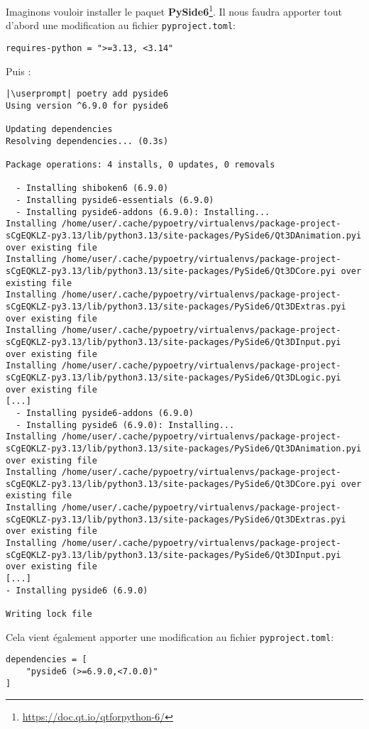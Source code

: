 Imaginons vouloir installer le paquet \textbf{PySide6}\footnote{\url{https://doc.qt.io/qtforpython-6/}}. Il nous faudra apporter tout d'abord une modification au fichier \texttt{pyproject.toml}:
\begin{lstlisting}[style=file]
requires-python = ">=3.13, <3.14"
\end{lstlisting}

Puis :
\begin{lstlisting}[style=bash]
|\userprompt| poetry add pyside6
Using version ^6.9.0 for pyside6

Updating dependencies
Resolving dependencies... (0.3s)

Package operations: 4 installs, 0 updates, 0 removals

  - Installing shiboken6 (6.9.0)
  - Installing pyside6-essentials (6.9.0)
  - Installing pyside6-addons (6.9.0): Installing...
Installing /home/user/.cache/pypoetry/virtualenvs/package-project-sCgEQKLZ-py3.13/lib/python3.13/site-packages/PySide6/Qt3DAnimation.pyi over existing file
Installing /home/user/.cache/pypoetry/virtualenvs/package-project-sCgEQKLZ-py3.13/lib/python3.13/site-packages/PySide6/Qt3DCore.pyi over existing file
Installing /home/user/.cache/pypoetry/virtualenvs/package-project-sCgEQKLZ-py3.13/lib/python3.13/site-packages/PySide6/Qt3DExtras.pyi over existing file
Installing /home/user/.cache/pypoetry/virtualenvs/package-project-sCgEQKLZ-py3.13/lib/python3.13/site-packages/PySide6/Qt3DInput.pyi over existing file
Installing /home/user/.cache/pypoetry/virtualenvs/package-project-sCgEQKLZ-py3.13/lib/python3.13/site-packages/PySide6/Qt3DLogic.pyi over existing file
[...]
  - Installing pyside6-addons (6.9.0)
  - Installing pyside6 (6.9.0): Installing...
Installing /home/user/.cache/pypoetry/virtualenvs/package-project-sCgEQKLZ-py3.13/lib/python3.13/site-packages/PySide6/Qt3DAnimation.pyi over existing file
Installing /home/user/.cache/pypoetry/virtualenvs/package-project-sCgEQKLZ-py3.13/lib/python3.13/site-packages/PySide6/Qt3DCore.pyi over existing file
Installing /home/user/.cache/pypoetry/virtualenvs/package-project-sCgEQKLZ-py3.13/lib/python3.13/site-packages/PySide6/Qt3DExtras.pyi over existing file
Installing /home/user/.cache/pypoetry/virtualenvs/package-project-sCgEQKLZ-py3.13/lib/python3.13/site-packages/PySide6/Qt3DInput.pyi over existing file
[...]
- Installing pyside6 (6.9.0)

Writing lock file
\end{lstlisting}

Cela vient également apporter une modification au fichier \texttt{pyproject.toml}:
\begin{lstlisting}[style=file]
dependencies = [
    "pyside6 (>=6.9.0,<7.0.0)"
]
\end{lstlisting}

